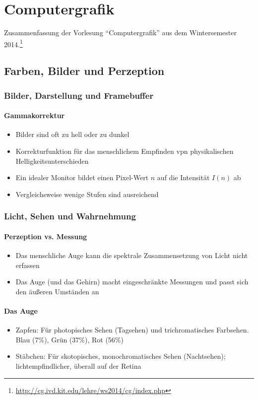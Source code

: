 \chapter{Computergrafik}

Zusammenfassung der Vorlesung "`Computergrafik"' aus dem Wintersemester 2014.\footnote{\url{http://cg.ivd.kit.edu/lehre/ws2014/cg/index.php}}

\section{Farben, Bilder und Perzeption}

\subsection{Bilder, Darstellung und Framebuffer}

\subsubsection{Gammakorrektur}
\begin{itemize}
	\item Bilder sind oft zu hell oder zu dunkel
	\item Korrekturfunktion für das menschlichem Empfinden vpn physikalischen Helligkeitsunterschieden
	\item Ein idealer Monitor bildet einen Pixel-Wert \(n\) auf die Intensität \(I(n)\) ab
	\item Vergleichsweise wenige Stufen sind ausreichend
\end{itemize}


\subsection{Licht, Sehen und Wahrnehmung}

\subsubsection{Perzeption vs. Messung}
\begin{itemize}
	\item Das menschliche Auge kann die spektrale Zusammensetzung von Licht nicht erfassen
	\item Das Auge (und das Gehirn) macht eingeschränkte Messungen und passt sich den äußeren Umständen an
\end{itemize}

\subsubsection{Das Auge}
\begin{itemize}
	\item Zapfen: Für photopisches Sehen (Tagsehen) und trichromatisches Farbsehen. Blau (7\%), Grün (37\%), Rot (56\%)
	\item Stäbchen: Für skotopisches, monochromatisches Sehen (Nachtsehen); lichtempfindlicher, überall auf der Retina
\end{itemize}


